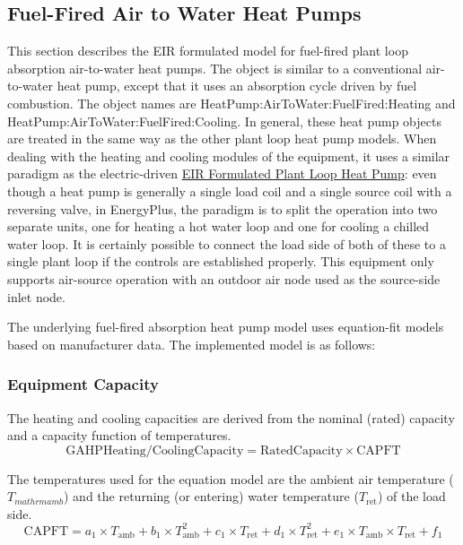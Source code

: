 \subsection{Fuel-Fired Air to Water Heat Pumps}\label{fuel-fired-air-to-water-heat-pumps}

This section describes the EIR formulated model for fuel-fired plant loop absorption air-to-water heat pumps. The object is similar to a conventional air-to-water heat pump, except that it uses an absorption cycle driven by fuel combustion. The object names are HeatPump:AirToWater:FuelFired:Heating and HeatPump:AirToWater:FuelFired:Cooling. In general, these heat pump objects are treated in the same way as the other plant loop heat pump models. When dealing with the heating and cooling modules of the equipment, it uses a similar paradigm as the electric-driven \hyperref[eir-plant-loop-heat-pump-model]{EIR Formulated Plant Loop Heat Pump}: even though a heat pump is generally a single load coil and a single source coil with a reversing valve, in EnergyPlus, the paradigm is to split the operation into two separate units, one for heating a hot water loop and one for cooling a chilled water loop. It is certainly possible to connect the load side of both of these to a single plant loop if the controls are established properly. This equipment only supports air-source operation with an outdoor air node used as the source-side inlet node.

The underlying fuel-fired absorption heat pump model uses equation-fit models based on manufacturer data. The implemented model is as follows: 

\subsubsection{Equipment Capacity}
The heating and cooling capacities are derived from the nominal (rated) capacity and a capacity function of temperatures. 
\begin{equation}
\mathrm{GAHP Heating/Cooling Capacity} = \mathrm{Rated Capacity} \times \mathrm{CAPFT}
\end{equation}

The temperatures used for the equation model are the ambient air temperature ($T_{mathrm{amb}}$) and the returning (or entering) water temperature ($T_{\mathrm{ret}}$) of the load side.
\begin{equation}
\mathrm{CAPFT} = a_1 \times T_{\mathrm{amb}} + b_1 \times T_{\mathrm{amb}}^{2} + c_1 \times T_{\mathrm{ret}} + d_1 \times T_{\mathrm{ret}}^{2} + e_1 \times T_{\mathrm{amb}} \times T_{\mathrm{ret}} + f_1
\end{equation}

